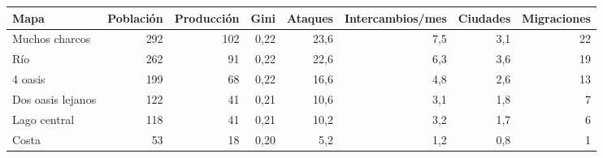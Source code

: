 \begin{tabular}{lrrrrrrr}
\toprule
Mapa & Población & Producción & Gini & Ataques & Intercambios/mes & Ciudades & Migraciones \\
\midrule
Muchos charcos & 292 & 102 & 0,22 & 23,6 & 7,5 & 3,1 & 22 \\
Río & 262 & 91 & 0,22 & 22,6 & 6,3 & 3,6 & 19 \\
4 oasis & 199 & 68 & 0,22 & 16,6 & 4,8 & 2,6 & 13 \\
Dos oasis lejanos & 122 & 41 & 0,21 & 10,6 & 3,1 & 1,8 & 7 \\
Lago central & 118 & 41 & 0,21 & 10,2 & 3,2 & 1,7 & 6 \\
Costa & 53 & 18 & 0,20 & 5,2 & 1,2 & 0,8 & 1 \\
\bottomrule
\end{tabular}
